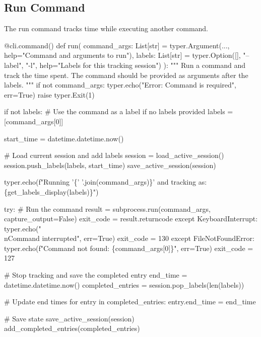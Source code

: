 \subsection{Run Command}

The run command tracks time while executing another command.

\nwenddocs{}\endmoddef\nwstartdeflinemarkup{}\nwenddeflinemarkup
@cli.command()
def run(
    command_args: List[str] = typer.Argument(..., help="Command and arguments to run"),
    labels: List[str] = typer.Option([], "--label", "-l", help="Labels for this tracking session")
):
    """
    Run a command and track the time spent.
    The command should be provided as arguments after the labels.
    """
    if not command_args:
        typer.echo("Error: Command is required", err=True)
        raise typer.Exit(1)
    
    if not labels:
        # Use the command as a label if no labels provided
        labels = [command_args[0]]
    
    start_time = datetime.datetime.now()
    
    # Load current session and add labels
    session = load_active_session()
    session.push_labels(labels, start_time)
    save_active_session(session)
    
    typer.echo(f"Running '\{' '.join(command_args)\}' and tracking as: \{get_labels_display(labels)\}")
    
    try:
        # Run the command
        result = subprocess.run(command_args, capture_output=False)
        exit_code = result.returncode
    except KeyboardInterrupt:
        typer.echo("\\nCommand interrupted", err=True)
        exit_code = 130
    except FileNotFoundError:
        typer.echo(f"Command not found: \{command_args[0]\}", err=True)
        exit_code = 127
    
    # Stop tracking and save the completed entry
    end_time = datetime.datetime.now()
    completed_entries = session.pop_labels(len(labels))
    
    # Update end times
    for entry in completed_entries:
        entry.end_time = end_time
    
    # Save state
    save_active_session(session)
    add_completed_entries(completed_entries)
    
